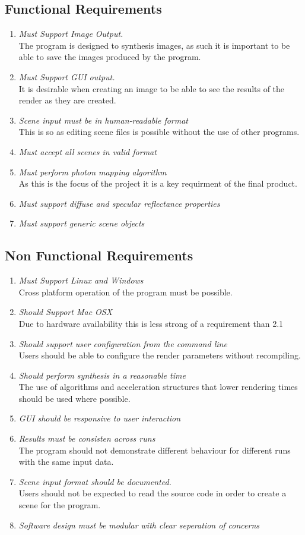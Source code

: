 \newcommand{\req}[2]
{
	\item {\it #1} \hfill \\ #2
}
  
\subsection{Functional Requirements}

\begin{enumerate}[{1}.1]
	\req{Must Support Image Output.}
	{
		The program is designed to synthesis images, as such it is important to be able to
		save the images produced by the program.
	}

	\req{Must Support GUI output.}
	{
		It is desirable when creating an image to be able to see the results of the render as they are created.
	}
	\req{Scene input must be in human-readable format}
	{
		This is so as editing scene files is possible without the use of other programs.
	}

	\req{Must accept all scenes in valid format}
	{
	}

	\req{Must perform photon mapping algorithm}
	{
		As this is the focus of the project it is a key requirment of the final product.
	}

	\req{Must support diffuse and specular reflectance properties}

	\req{Must support generic scene objects}
\end{enumerate}

\subsection{Non Functional Requirements}

\begin{enumerate}[{2}.1]
	\req{Must Support Linux and Windows}
	{
		Cross platform operation of the program must be possible.
	}
	\req{Should Support Mac OSX}
	{
		Due to hardware availability this is less strong of a requirement than 2.1
	}
	\req{Should support user configuration from the command line}
	{
		Users should be able to configure the render parameters without recompiling.
	}
	\req{Should perform synthesis in a reasonable time}
	{
		The use of algorithms and acceleration structures that lower rendering times
		should be used where possible.
	}
	\req{GUI should be responsive to user interaction}{}
	\req{Results must be consisten across runs}
	{
		The program should not demonstrate different behaviour for different runs with
		the same input data.
	}
	\req{Scene input format should be documented.}
	{
		Users should not be expected to read the source code in order to create
		a scene for the program.
	}
	\req{Software design must be modular with clear seperation of concerns}
\end{enumerate}
